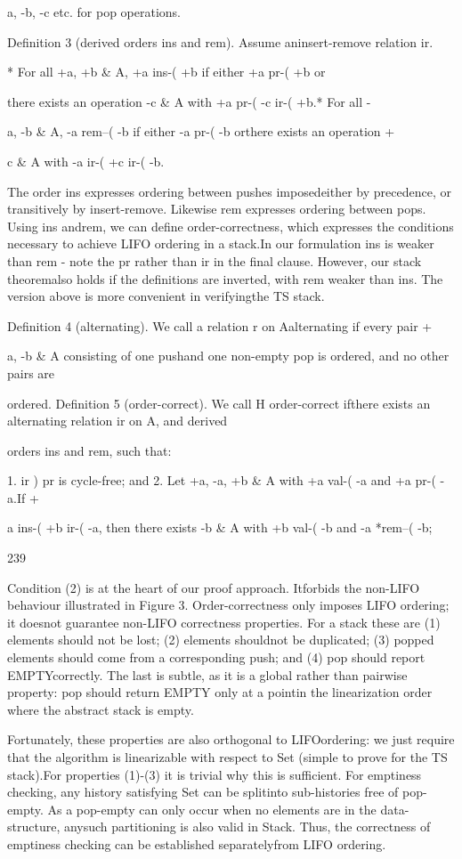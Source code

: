 a, -b, -c etc. for pop operations.

Definition 3 (derived orders ins and rem). Assume aninsert-remove relation ir.

* For all +a, +b & A, +a ins-( +b if either +a pr-( +b or

there exists an operation -c & A with +a pr-( -c ir-( +b.* For all -

a, -b & A, -a rem--( -b if either -a pr-( -b orthere exists an operation +

c & A with -a ir-( +c ir-( -b.

The order ins expresses ordering between pushes imposedeither by precedence, or transitively by insert-remove. Likewise rem expresses ordering between pops. Using ins andrem, we can define order-correctness, which expresses the
conditions necessary to achieve LIFO ordering in a stack.In our formulation ins is weaker than rem - note the pr
rather than ir in the final clause. However, our stack theoremalso holds if the definitions are inverted, with rem weaker
than ins. The version above is more convenient in verifyingthe TS stack.

Definition 4 (alternating). We call a relation r on Aalternating if every pair +

a, -b & A consisting of one pushand one non-empty pop is ordered, and no other pairs are

ordered.
Definition 5 (order-correct). We call H order-correct ifthere exists an alternating relation ir on A, and derived

orders ins and rem, such that:

1. ir ) pr is cycle-free; and
2. Let +a, -a, +b & A with +a val-( -a and +a pr-( -a.If +

a ins-( +b ir-( -a, then there exists -b & A with
+b val-( -b and -a *rem--( -b;

239

Condition (2) is at the heart of our proof approach. Itforbids the non-LIFO behaviour illustrated in Figure 3.
Order-correctness only imposes LIFO ordering; it doesnot guarantee non-LIFO correctness properties. For a stack
these are (1) elements should not be lost; (2) elements shouldnot be duplicated; (3) popped elements should come from
a corresponding push; and (4) pop should report EMPTYcorrectly. The last is subtle, as it is a global rather than
pairwise property: pop should return EMPTY only at a pointin the linearization order where the abstract stack is empty.

Fortunately, these properties are also orthogonal to LIFOordering: we just require that the algorithm is linearizable
with respect to Set (simple to prove for the TS stack).For properties (1)-(3) it is trivial why this is sufficient. For
emptiness checking, any history satisfying Set can be splitinto sub-histories free of pop-empty. As a pop-empty can
only occur when no elements are in the data-structure, anysuch partitioning is also valid in Stack. Thus, the correctness of emptiness checking can be established separatelyfrom LIFO ordering.

